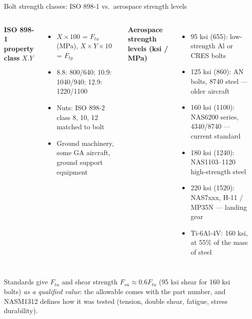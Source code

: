 \documentclass[aspectratio=169,10pt]{beamer}
\begin{document}
\begin{frame}{Bolt strength classes: ISO 898-1 vs.\ aerospace strength levels}
\footnotesize
\begin{columns}[T]
\textbf{ISO 898-1 property class} $X.Y$
\begin{itemize}
  \item $X\times100$ = $F_{tu}$ (MPa), $X\times Y\times 10$ = $F_{ty}$
  \item 8.8: 800/640; 10.9: 1040/940; 12.9: 1220/1100
  \item Nuts: ISO 898-2 class 8, 10, 12 matched to bolt
  \item Ground machinery, some GA aircraft, ground support equipment
\end{itemize}
\textbf{Aerospace strength levels (ksi / MPa)}
\begin{itemize}
  \item 95 ksi (655): low-strength Al or CRES bolts
  \item 125 ksi (860): AN bolts, 8740 steel --- older aircraft
  \item 160 ksi (1100): NAS6200 series, 4340/8740 --- current standard
  \item 180 ksi (1240): NAS1103--1120 high-strength steel
  \item 220 ksi (1520): NAS7xxx, H-11 / MP35N --- landing gear
  \item Ti-6Al-4V: 160 ksi, at 55\% of the mass of steel
\end{itemize}
\end{columns}
\vspace{4pt}
\small Standards give $F_{tu}$ and shear strength $F_{su}\approx 0.6F_{tu}$ (95 ksi shear for 160 ksi bolts) \emph{as a qualified value}: the allowable comes with the part number, and NASM1312 defines how it was tested (tension, double shear, fatigue, stress durability).
\end{frame}
\end{document}
